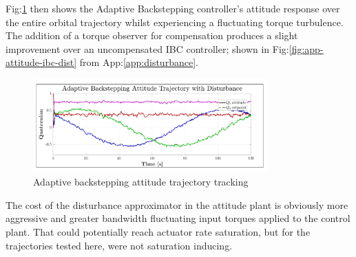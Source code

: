 \par
Fig:\ref{fig:ABC_trajectory} then shows the Adaptive Backstepping controller's attitude response over the entire orbital trajectory whilst experiencing a fluctuating torque turbulence. The addition of a torque observer for compensation produces a slight improvement over an uncompensated IBC controller; shown in Fig:\ref{fig:app-attitude-ibc-dist} from App:\ref{app:disturbance}. 
\begin{figure}[hbtp]
\vspace{-6pt}
\centering
\includegraphics[width=0.8\textwidth]{graphs/ABC_trajectory}
\vspace{-12pt}
\caption{Adaptive backstepping attitude trajectory tracking}
\label{fig:ABC_trajectory}
\vspace{-16pt}
\end{figure}
\par
The cost of the disturbance approximator in the attitude plant is obviously more aggressive and greater bandwidth fluctuating input torques applied to the control plant. That could potentially reach actuator rate saturation, but for the trajectories tested here, were not saturation inducing.
